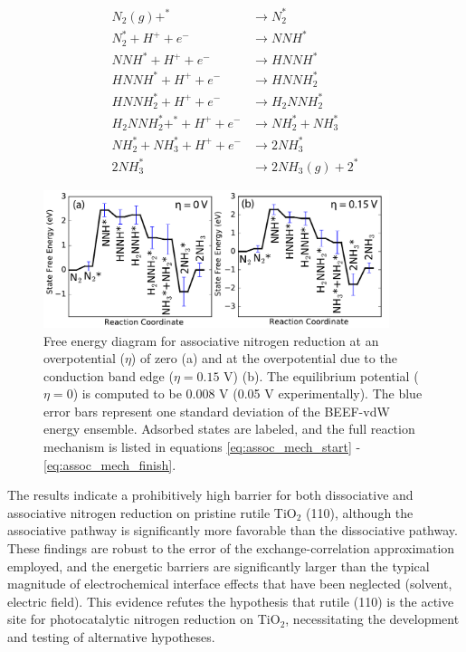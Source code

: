 \documentclass[journal=ascecg,manuscript=article,articletitle=true]{achemso}
\begin{document}
\begin{align}
	\label{eq:assoc_mech_start}
	N_2(g)+^*  & \rightarrow N_2^{*} \\
    N_2^* + H^+ + e^-  & \rightarrow NNH^* \\
    NNH^* + H^+ + e^- & \rightarrow HNNH^* \\
    HNNH^* + H^+ + e^- & \rightarrow  HNNH_2^* \\
    HNNH_2^* + H^+ + e^- & \rightarrow H_2NNH_2^* \\
    H_2NNH_2^* + ^* + H^+ + e^- & \rightarrow NH_2^* + NH_3^* \\
    NH_2^* + NH_3^* + H^+ + e^- & \rightarrow 2NH_3^*  \\
    2NH_3^*  & \rightarrow 2NH_3(g) + 2^{*} 
    \label{eq:assoc_mech_finish}
\end{align}

\begin{figure}
\includegraphics[width=0.9\textwidth]{figures/associative_FED.pdf}
\caption{Free energy diagram for associative nitrogen reduction at an overpotential ($\eta$) of zero (a) and at the overpotential due to the conduction band edge ($\eta=0.15$ V) (b). The equilibrium potential ($\eta=0$) is computed to be 0.008 V (0.05 V experimentally). The blue error bars represent one standard deviation of the BEEF-vdW energy ensemble. Adsorbed states are labeled, and the full reaction mechanism is listed in equations \ref{eq:assoc_mech_start} - \ref{eq:assoc_mech_finish}.}
\label{fig:FED_assoc}
\end{figure}

The results indicate a prohibitively high barrier for both dissociative and associative nitrogen reduction on pristine rutile TiO$_2$ (110), although the associative pathway is significantly more favorable than the dissociative pathway. These findings are robust to the error of the exchange-correlation approximation employed, and the energetic barriers are significantly larger than the typical magnitude of electrochemical interface effects that have been neglected (solvent, electric field). This evidence refutes the hypothesis that rutile (110) is the active site for photocatalytic nitrogen reduction on TiO$_2$, necessitating the development and testing of alternative hypotheses.
\end{document}
